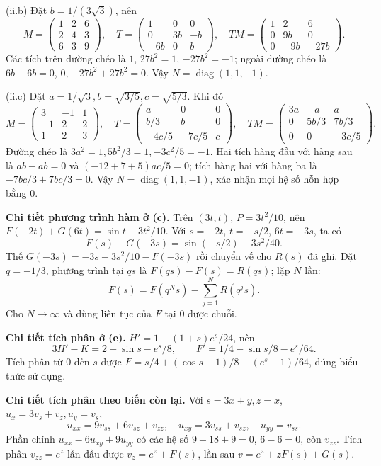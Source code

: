 (ii.b) Đặt $b=1/(3\sqrt3)$, nên
\[M=\begin{pmatrix}1&2&6\\2&4&3\\6&3&9\end{pmatrix},\quad
T=\begin{pmatrix}1&0&0\\0&3b&-b\\-6b&0&b\end{pmatrix},\quad
TM=\begin{pmatrix}1&2&6\\0&9b&0\\0&-9b&-27b\end{pmatrix}.\]
Các tích trên đường chéo là $1$, $27b^2=1$, $-27b^2=-1$; ngoài đường chéo là $6b-6b=0$, $0$, $-27b^2+27b^2=0$. Vậy $N=\operatorname{diag}(1,1,-1)$.

(ii.c) Đặt $a=1/\sqrt3,b=\sqrt{3/5},c=\sqrt{5/3}$. Khi đó
\[M=\begin{pmatrix}3&-1&1\\-1&2&2\\1&2&3\end{pmatrix},\quad
T=\begin{pmatrix}a&0&0\\b/3&b&0\\-4c/5&-7c/5&c\end{pmatrix},\quad
TM=\begin{pmatrix}3a&-a&a\\0&5b/3&7b/3\\0&0&-3c/5\end{pmatrix}.\]
Đường chéo là $3a^2=1,5b^2/3=1,-3c^2/5=-1$. Hai tích hàng đầu với hàng sau là $ab-ab=0$ và $(-12+7+5)ac/5=0$; tích hàng hai với hàng ba là $-7bc/3+7bc/3=0$. Vậy $N=\operatorname{diag}(1,1,-1)$, xác nhận mọi hệ số hỗn hợp bằng $0$.

\textbf{Chi tiết phương trình hàm ở (c).} Trên $(3t,t)$, $P=3t^2/10$, nên $F(-2t)+G(6t)=\sin t-3t^2/10$. Với $s=-2t$, $t=-s/2$, $6t=-3s$, ta có
\[F(s)+G(-3s)=\sin(-s/2)-3s^2/40.\]
Thế $G(-3s)=-3s-3s^2/10-F(-3s)$ rồi chuyển vế cho $R(s)$ đã ghi. Đặt $q=-1/3$, phương trình tại $qs$ là $F(qs)-F(s)=R(qs)$; lặp $N$ lần:
\[F(s)=F(q^Ns)-\sum_{j=1}^{N}R(q^js).\]
Cho $N\to\infty$ và dùng liên tục của $F$ tại $0$ được chuỗi.

\textbf{Chi tiết tích phân ở (e).} $H'=1-(1+s)e^s/24$, nên
\[3H'-K=2-\sin s-e^s/8,\qquad F'=1/4-\sin s/8-e^s/64.\]
Tích phân từ $0$ đến $s$ được $F=s/4+(\cos s-1)/8-(e^s-1)/64$, đúng biểu thức sử dụng.

\textbf{Chi tiết tích phân theo biến còn lại.} Với $s=3x+y,z=x$, $u_x=3v_s+v_z,u_y=v_s$,
\[u_{xx}=9v_{ss}+6v_{sz}+v_{zz},\quad u_{xy}=3v_{ss}+v_{sz},\quad u_{yy}=v_{ss}.\]
Phần chính $u_{xx}-6u_{xy}+9u_{yy}$ có các hệ số $9-18+9=0$, $6-6=0$, còn $v_{zz}$. Tích phân $v_{zz}=e^z$ lần đầu được $v_z=e^z+F(s)$, lần sau $v=e^z+zF(s)+G(s)$.

